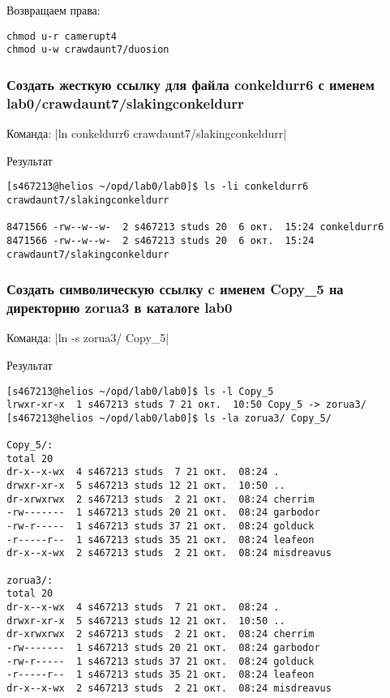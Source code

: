 Возвращаем права:
\begin{verbatim}
chmod u-r camerupt4
chmod u-w crawdaunt7/duosion
\end{verbatim}


\subsubsection*{Создать жесткую ссылку для файла conkeldurr6 с именем lab0/crawdaunt7/slakingconkeldurr}

Команда: |ln conkeldurr6 crawdaunt7/slakingconkeldurr|

Результат
\begin{verbatim}
[s467213@helios ~/opd/lab0/lab0]$ ls -li conkeldurr6 crawdaunt7/slakingconkeldurr

8471566 -rw--w--w-  2 s467213 studs 20  6 окт.  15:24 conkeldurr6
8471566 -rw--w--w-  2 s467213 studs 20  6 окт.  15:24 crawdaunt7/slakingconkeldurr
\end{verbatim}

\subsubsection*{Создать символическую ссылку c именем Copy\_5 на директорию zorua3 в каталоге lab0}
Команда: |ln -s zorua3/ Copy_5|

Результат
\begin{verbatim}
[s467213@helios ~/opd/lab0/lab0]$ ls -l Copy_5
lrwxr-xr-x  1 s467213 studs 7 21 окт.  10:50 Copy_5 -> zorua3/
[s467213@helios ~/opd/lab0/lab0]$ ls -la zorua3/ Copy_5/

Copy_5/:
total 20
dr-x--x-wx  4 s467213 studs  7 21 окт.  08:24 .
drwxr-xr-x  5 s467213 studs 12 21 окт.  10:50 ..
dr-xrwxrwx  2 s467213 studs  2 21 окт.  08:24 cherrim
-rw-------  1 s467213 studs 20 21 окт.  08:24 garbodor
-rw-r-----  1 s467213 studs 37 21 окт.  08:24 golduck
-r-----r--  1 s467213 studs 35 21 окт.  08:24 leafeon
dr-x--x-wx  2 s467213 studs  2 21 окт.  08:24 misdreavus

zorua3/:
total 20
dr-x--x-wx  4 s467213 studs  7 21 окт.  08:24 .
drwxr-xr-x  5 s467213 studs 12 21 окт.  10:50 ..
dr-xrwxrwx  2 s467213 studs  2 21 окт.  08:24 cherrim
-rw-------  1 s467213 studs 20 21 окт.  08:24 garbodor
-rw-r-----  1 s467213 studs 37 21 окт.  08:24 golduck
-r-----r--  1 s467213 studs 35 21 окт.  08:24 leafeon
dr-x--x-wx  2 s467213 studs  2 21 окт.  08:24 misdreavus
\end{verbatim}


